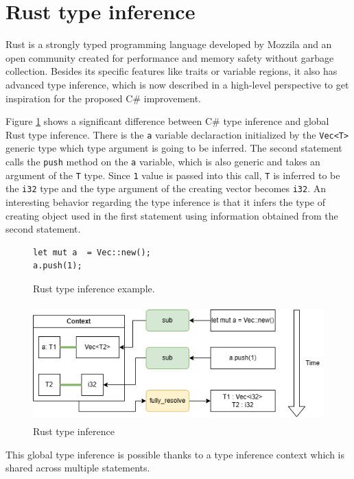\section{Rust type inference}

Rust is a strongly typed programming language developed by Mozzila and an open community created for performance and memory safety without garbage collection. 
Besides its specific features like traits or variable regions, it also has advanced type inference, which is now described in a high-level perspective to get inspiration for the proposed C\# improvement.
\par
Figure \ref{img17:rustCodeExample} shows a significant difference between C\# type inference and global Rust type inference.
There is the \texttt{a} variable declaraction initialized by the \texttt{Vec<T>} generic type which type argument is going to be inferred.
The second statement calls the \texttt{push} method on the \texttt{a} variable, which is also generic and takes an argument of the \texttt{T} type.
Since \texttt{1} value is passed into this call, \texttt{T} is inferred to be the \texttt{i32} type and the type argument of the creating vector becomes \texttt{i32}.
An interesting behavior regarding the type inference is that it infers the type of creating object used in the first statement using information obtained from the second statement.
\begin{figure}[h]
\begin{lstlisting}
let mut a  = Vec::new();
a.push(1);
\end{lstlisting}
\caption{Rust type inference example.}
\label{img17:rustCodeExample}
\end{figure}
\begin{figure}[h]
\centering
\includegraphics[width=120mm, height=45mm]{./img/RustTypeInference.png}
\caption{Rust type inference}
\label{img18:rustTypeInference}
\end{figure}
\par
\par
This global type inference is possible thanks to a type inference context which is shared across multiple statements. 
